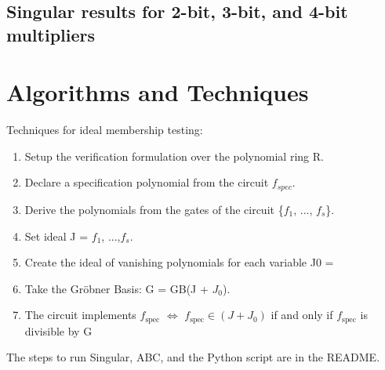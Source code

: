 \documentclass[conference]{IEEEtran}
\begin{document}
\subsection{Singular results for 2-bit, 3-bit, and 4-bit multipliers}





\section{Algorithms and Techniques}
Techniques for ideal membership testing: 
\begin{enumerate}
    \item Setup the verification formulation over the polynomial ring R. 
    \item Declare a specification polynomial from the circuit $f_{spec}$.
    \item Derive the polynomials from the gates of the circuit \{$f_{1}$, ..., $f_{s}$\}. 
    \item Set ideal J = $f_{1}$, ...,$f_{s}$.     %
    \item Create the ideal of vanishing polynomials for each variable J0 = 
    \item Take the Gröbner Basis: G = GB(J + $J_{0}$).  
    \item The circuit implements \(f_{\text{spec}}\) \(\Longleftrightarrow\) \(f_{\text{spec}} \in (J + J_0)\) if and only if \(f_{\text{spec}}\)
    is divisible by G
\end{enumerate}
The steps to run Singular, ABC, and the Python script are in the README. 
\end{document}
